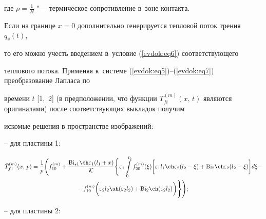 где $\rho = \frac 1 H$ "--- термическое сопротивление в~зоне контакта.



Если на границе $x = 0$ дополнительно генерируется тепловой поток трения $q_v(t)$, 

то его можно учесть введением в~условие (\ref{evdok:eq6}) соответствующего 

теплового потока. Применяя к~системе (\ref{evdok:eq5})--(\ref{evdok:eq7}) преобразование Лапласа по 

времени $t$ [1,~2] (в предположении, что функции $T_{fi}^{(m)} (x,\,t)$ являются оригиналами) после соответствующих выкладок получим 

искомые решения в пространстве изображений:



-- для пластины 1:

\begin{multline}

\label{evdok:eq8}

\bar {T}_{f1}^{(m)} (x,\,p) = \frac{1}{p} \Bigg( f_{10}^{(m)}  +

 \frac{{\rm Bi}_{s1} \ch\varepsilon _1 (l_1 + x)}{ \mathcal{K}}\Bigg\{ \varepsilon _1 \int\limits_0^{l_2 } 

f_{20}^{(m)} (\xi )\bigg[ \varepsilon _1 l_1 \ch\varepsilon _2 (l_2  

- \xi )  + {\rm Bi}_2 \ch\varepsilon _2 (l_2 - \xi )\bigg]d\xi - \\ - f_{10}^{(m)} 

\bigg(\varepsilon _2 l_2 \sh(\varepsilon _2 l_2 ) + {\rm Bi}_2 \ch(\varepsilon _2 l_2 )\bigg)

\Bigg\} \Bigg);

\end{multline}





-- для пластины 2:




